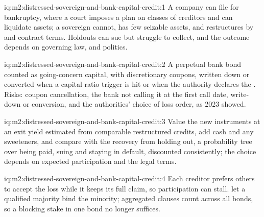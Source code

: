 \begin{solution}{iq:m2:distressed-sovereign-and-bank-capital-credit:1}
A company can file for bankruptcy, where a court imposes a plan on classes of
creditors and can liquidate assets; a sovereign cannot, has few seizable assets, and
restructures by  and contract terms. Holdouts can sue but struggle to
collect, and the outcome depends on governing law,  and
politics.
\end{solution}

\begin{solution}{iq:m2:distressed-sovereign-and-bank-capital-credit:2}
A perpetual bank bond counted as going-concern capital, with discretionary coupons,
written down or converted when a capital ratio trigger is hit or when the authority
declares the . Risks: coupon cancellation, the bank not calling it
at the first call date, write-down or conversion, and the authorities' choice of loss
order, as 2023 showed.
\end{solution}

\begin{solution}{iq:m2:distressed-sovereign-and-bank-capital-credit:3}
Value the new instruments at an exit yield estimated from comparable restructured
credits, add cash and any sweeteners, and compare with the recovery from holding out,
a probability tree over being paid, suing and staying in default, discounted
consistently; the choice depends on expected participation and the legal terms.
\end{solution}

\begin{solution}{iq:m2:distressed-sovereign-and-bank-capital-credit:4}
Each creditor prefers others to accept the loss while it keeps its full claim, so
participation can stall.  let a qualified majority bind the
minority; aggregated clauses count across all bonds, so a blocking stake in one bond
no longer suffices.
\end{solution}

